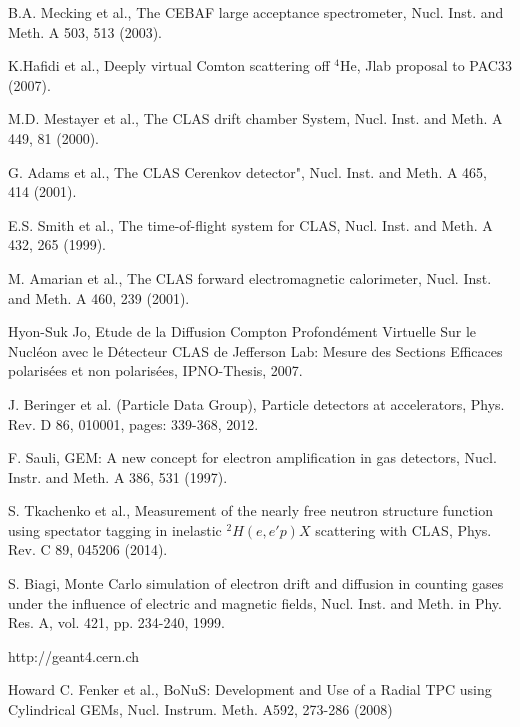 \documentclass[twocolumn,showpacs,superscriptaddress,groupedaddress]{revtex4}
\begin{document}
\begin{thebibliography}{99}

   B.A. Mecking et al., The CEBAF large acceptance spectrometer, Nucl. Inst. 
   and Meth. A 503, 513 (2003).

   K.Hafidi et al., Deeply virtual Comton scattering off $^{4}$He, Jlab 
   proposal to PAC33 (2007).

   M.D. Mestayer et al., The CLAS drift chamber System, Nucl. Inst.  and Meth.  
   A 449, 81 (2000).

   G. Adams et al., The CLAS Cerenkov detector", Nucl. Inst. and Meth. A 465, 
   414 (2001).

   E.S. Smith et al., The time-of-flight system for CLAS, Nucl.  Inst. and 
   Meth. A 432, 265 (1999).

   M. Amarian et al., The CLAS forward electromagnetic calorimeter, Nucl.  
   Inst. and Meth. A 460, 239 (2001). 

   Hyon-Suk Jo, Etude de la Diffusion Compton Profond{\'e}ment Virtuelle Sur le 
   Nucl{\'e}on avec le D{\'e}tecteur CLAS de Jefferson Lab: Mesure des Sections 
   Efficaces polaris{\'e}es et non polaris{\'e}es, IPNO-Thesis, 2007.

   J. Beringer et al. (Particle Data Group), Particle detectors at 
   accelerators, Phys. Rev. D 86, 010001, pages: 339-368, 2012.

   F. Sauli, GEM: A new concept for electron amplification in gas detectors, 
   Nucl. Instr. and Meth. A 386, 531 (1997).

   S. Tkachenko et al., Measurement of the nearly free neutron structure 
   function using spectator tagging in inelastic $^{2}H(e,e'p)X$ scattering 
   with CLAS,	Phys. Rev. C 89, 045206 (2014).

   S. Biagi, Monte Carlo simulation of electron drift and diffusion in counting 
   gases under the influence of electric and magnetic fields, Nucl.  Inst. and 
   Meth. in Phy. Res. A, vol. 421, pp. 234-240, 1999.

http://geant4.cern.ch
 	
Howard C. Fenker et al., BoNuS: Development and Use of a Radial TPC using Cylindrical GEMs, Nucl. Instrum. Meth. A592, 273-286 (2008)
\end{thebibliography}
\end{document}
